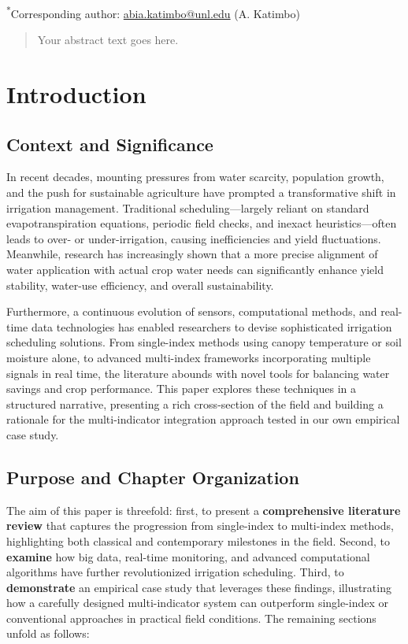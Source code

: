 \documentclass[12pt]{article}
\begin{document}
\vspace{1em}
\noindent
\textsuperscript{*}Corresponding author: \href{mailto:abia.katimbo@unl.edu}{abia.katimbo@unl.edu} (A. Katimbo)


\vspace{1em}
\begin{abstract}
Your abstract text goes here.
\end{abstract}

 

\section{Introduction}

\subsection{Context and Significance}
In recent decades, mounting pressures from water scarcity, population growth, and the push for sustainable agriculture have prompted a transformative shift in irrigation management. Traditional scheduling—largely reliant on standard evapotranspiration equations, periodic field checks, and inexact heuristics—often leads to over- or under-irrigation, causing inefficiencies and yield fluctuations. Meanwhile, research has increasingly shown that a more precise alignment of water application with actual crop water needs can significantly enhance yield stability, water-use efficiency, and overall sustainability. 

Furthermore, a continuous evolution of sensors, computational methods, and real-time data technologies has enabled researchers to devise sophisticated irrigation scheduling solutions. From single-index methods using canopy temperature or soil moisture alone, to advanced multi-index frameworks incorporating multiple signals in real time, the literature abounds with novel tools for balancing water savings and crop performance. This paper explores these techniques in a structured narrative, presenting a rich cross-section of the field and building a rationale for the multi-indicator integration approach tested in our own empirical case study.

\subsection{Purpose and Chapter Organization}
The aim of this paper is threefold: first, to present a \textbf{comprehensive literature review} that captures the progression from single-index to multi-index methods, highlighting both classical and contemporary milestones in the field. Second, to \textbf{examine} how big data, real-time monitoring, and advanced computational algorithms have further revolutionized irrigation scheduling. Third, to \textbf{demonstrate} an empirical case study that leverages these findings, illustrating how a carefully designed multi-indicator system can outperform single-index or conventional approaches in practical field conditions. The remaining sections unfold as follows:
\end{document}
